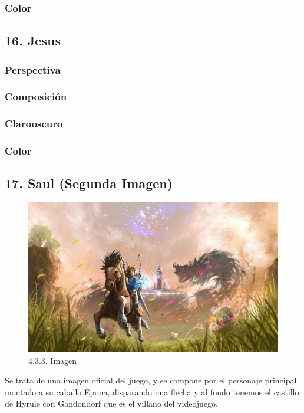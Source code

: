 \documentclass[12pt]{article}
\begin{document}
        \subsubsection{Color}
        \newpage


    \subsection{16. Jesus}
        \subsubsection{Perspectiva}

        \subsubsection{Composición}

        \subsubsection{Clarooscuro}

        \subsubsection{Color}
        \newpage


    \subsection{17. Saul (Segunda Imagen)}
    \begin{figure}[H]
      \centering
      \includegraphics[scale=0.7]{images/Saúl/Sección 17/EA_img17_0Main.png}
      \caption{\small 4.3.3. Imagen}
    \end{figure}
    Se trata de una imagen oficial del juego, y se compone por el personaje principal montado a su caballo Epona, disparando una flecha y al fondo tenemos el castillo de Hyrule con Gandondorf que es el villano del videojuego.
\end{document}
